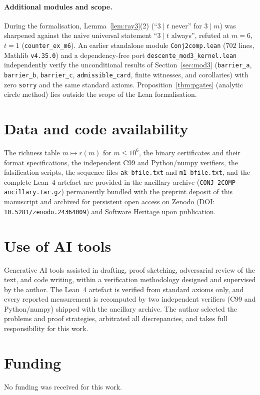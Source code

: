\documentclass[11pt]{article}
\theoremstyle{plain}
\theoremstyle{definition}
\newcommand{\rch}{r}
\begin{document}
\paragraph{Additional modules and scope.}
During the formalisation, Lemma~\ref{lem:ray3}(2) (``$3 \mid t$
never'' for $3 \mid m$) was sharpened against the naive universal
statement ``$3 \mid t$ always'', refuted at $m = 6$, $t = 1$
(\texttt{counter\_ex\_m6}). An earlier standalone module
\texttt{Conj2comp.lean} ($702$ lines, Mathlib \texttt{v4.35.0}) and
a dependency-free port \texttt{descente\_mod3\_kernel.lean}
independently verify the unconditional results of
Section~\ref{sec:mod3} (\texttt{barrier\_a}, \texttt{barrier\_b},
\texttt{barrier\_c}, \texttt{admissible\_card}, finite witnesses,
and corollaries) with zero \texttt{sorry} and the same standard
axioms. Proposition~\ref{thm:pgates} (analytic circle method) lies
outside the scope of the Lean formalisation.

\section*{Data and code availability}
The richness table $m \mapsto \rch(m)$ for $m \le 10^6$, the binary
certificates and their format specifications, the independent C99
and Python/numpy verifiers, the falsification scripts, the sequence
files \texttt{ak\_bfile.txt} and \texttt{m1\_bfile.txt}, and the
complete Lean~4 artefact are provided in the ancillary archive
(\texttt{CONJ-2COMP-ancillary.tar.gz}) permanently bundled with the
preprint deposit of this manuscript and archived for persistent open
access on Zenodo (DOI: \texttt{10.5281/zenodo.24364009}) and Software
Heritage upon publication.

\section*{Use of AI tools}
Generative AI tools assisted in drafting, proof sketching,
adversarial review of the text, and code writing, within a
verification methodology designed and supervised by the
author. The Lean~4 artefact is verified from standard axioms
only, and every reported measurement is recomputed by two
independent verifiers (C99 and Python/numpy) shipped with the
ancillary archive. The author selected the problems and proof
strategies, arbitrated all discrepancies, and takes full
responsibility for this work.

\section*{Funding}
No funding was received for this work.
\end{document}
